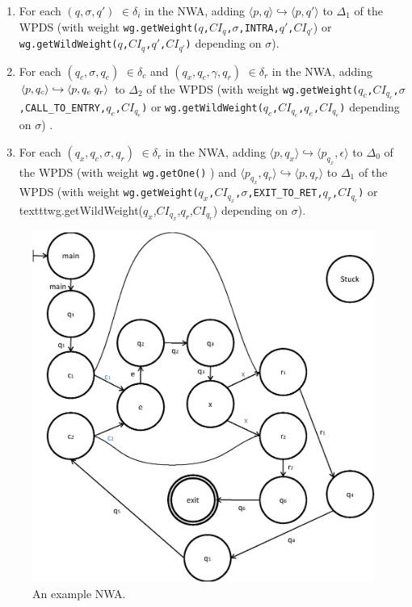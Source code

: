 \documentclass{llncs}
\begin{document}
\begin{enumerate}

\item For each $(q,\sigma,q')$ $\in \delta_i$ in the NWA, adding $\langle p,q \rangle \hookrightarrow \langle p,q' \rangle$  to $\Delta_1$ of the WPDS (with weight \texttt{wg.getWeight($q$,$CI_q$,$\sigma$,INTRA,$q'$,$CI_{q'}$}) or \texttt{wg.getWildWeight($q$,$CI_q$,$q'$,$CI_{q'}$)} depending on $\sigma$). 

\item For each $(q_c,\sigma, q_e)$ $\in \delta_c$ and $(q_x,q_c,\gamma,q_r)$ $\in \delta_r$ in the NWA, adding $\langle p,q_c \rangle \hookrightarrow \langle p, q_e \hspace{.1cm} q_r \rangle$ to $\Delta_2$ of the WPDS (with weight \texttt{wg.getWeight($q_c$,$CI_{q_c}$,$\sigma$,CALL\_TO\_ENTRY,$q_e$,$CI_{q_e}$)} or \texttt{wg.getWildWeight($q_c$,$CI_{q_c}$,$q_e$,$CI_{q_e}$)} depending on $\sigma$) .

\item For each $(q_x,q_c,\sigma,q_r)$ $\in \delta_r$ in the NWA, adding $\langle p,q_x \rangle \hookrightarrow \langle p_{q_x},\epsilon \rangle$ to $\Delta_0$ of the WPDS (with weight \texttt{wg.getOne()} ) and $\langle p_{q_x},q_r \rangle \hookrightarrow \langle p,q_r \rangle$ to $\Delta_1$ of the WPDS (with weight \texttt{wg.getWeight($q_x$,$CI_{q_x}$,$\sigma$,EXIT\_TO\_RET,$q_r$,$CI_{q_r}$)} or texttt{wg.getWildWeight($q_x$,$CI_{q_x}$,$q_r$,$CI_{q_r}$)} depending on $\sigma$).

\end{enumerate}

\begin{figure}[htbp]
  \centering
    \includegraphics[width=12cm]{Figures/Figure23.eps}
  \caption{An example NWA.}
  \label{Fig:NWAtoPDS1}
\end{figure}
\end{document}
